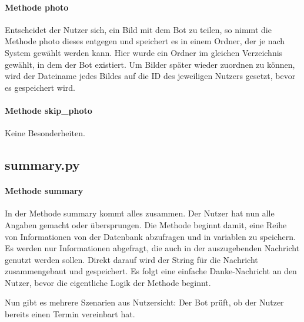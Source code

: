             \paragraph{Methode photo}
                Entscheidet der Nutzer sich, ein Bild mit dem Bot zu teilen, so nimmt die Methode photo dieses entgegen und speichert es in einem Ordner, der je nach System gewählt werden kann. Hier wurde ein Ordner im gleichen Verzeichnis gewählt, in dem der Bot existiert. Um Bilder später wieder zuordnen zu können, wird der Dateiname jedes Bildes auf die ID des jeweiligen Nutzers gesetzt, bevor es gespeichert wird.

            \paragraph{Methode skip\_photo}
                Keine Besonderheiten.
        

        \subsection{summary.py}
            \paragraph{Methode summary}
                In der Methode summary kommt alles zusammen. Der Nutzer hat nun alle Angaben gemacht oder übersprungen. Die Methode beginnt damit, eine Reihe von Informationen von der Datenbank abzufragen und in variablen zu speichern. Es werden nur Informationen abgefragt, die auch in der auszugebenden Nachricht genutzt werden sollen. Direkt darauf wird der String für die Nachricht zusammengebaut und gespeichert. Es folgt eine einfache Danke-Nachricht an den Nutzer, bevor die eigentliche Logik der Methode beginnt.
                
                Nun gibt es mehrere Szenarien aus Nutzersicht: Der Bot prüft, ob der Nutzer bereits einen Termin vereinbart hat.
                

